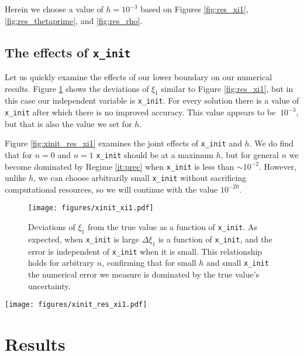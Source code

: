 \documentclass[twocolumn]{aastex631}
\begin{document}
Herein we choose a value of $h = 10^{-3}$ based on Figures \ref{fig:res_xi1},
\ref{fig:res_thetaprime}, and \ref{fig:res_rho}.

\subsection{The effects of \texttt{x\_init}}
\label{subsec:init}
Let us quickly examine the effects of our lower boundary on our
numerical results. Figure \ref{fig:xinit_xi1} shows the
deviations of $\xi_1$ similar to Figure \ref{fig:res_xi1},
but in this case our independent variable is \texttt{x\_init}.
For every solution there is a value of \texttt{x\_init}
after which there is no improved accuracy. This value appears to be
$~10^{-3}$, but that is also the value we set for $h$.

Figure \ref{fig:xinit_res_xi1} examines the joint effects of 
\texttt{x\_init} and $h$. We do find that for $n=0$ and $n=1$
\texttt{x\_init} should be at a maximum $h$, but for general $n$
we become dominated by Regime \ref{it:prec} when \texttt{x\_init}
is less than $\sim 10^{-2}$. However, unlike $h$, we can choose arbitrarily
small \texttt{x\_init} without sacrificing computational
resources, so we will continue with the value $10^{-20}$.

\begin{figure}[h]
    \begin{centering}
        \texttt{[image: figures/xinit\_xi1.pdf]}
        \caption{Deviations of $\xi_1$ from the true value as a
        function of \texttt{x\_init}. As expected, when \texttt{x\_init}
        is large $\Delta \xi_1$ is a function of \texttt{x\_init},
        and the error is independent of \texttt{x\_init} when it is small.
        This relationship holds for arbitrary $n$, confirming that
        for small $h$ and small \texttt{x\_init} the numerical
        error we measure is dominated by the true value's uncertainty.}
        \label{fig:xinit_xi1}
    \end{centering}
\end{figure}

\begin{figure*}[h]
    \begin{centering}
        \texttt{[image: figures/xinit\_res\_xi1.pdf]}
        \caption{Deviations of $\xi_1$ from the true value as a function
        of both \texttt{x\_init} and $h$. The dashed line
        marks the curve \texttt{x\_init}$=h$.}
        \label{fig:xinit_res_xi1}
    \end{centering}
\end{figure*}

\section{Results}
\label{sec:results}






\end{document}
